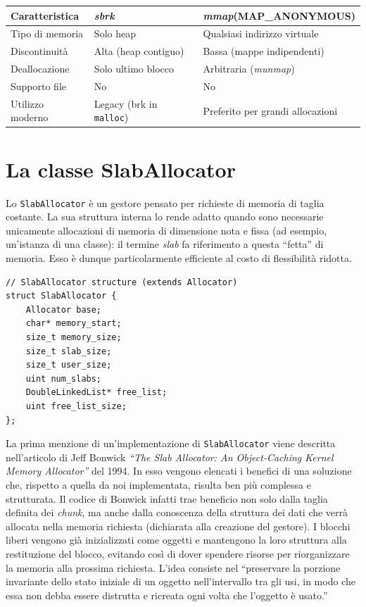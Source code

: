 \begin{center}
\begin{tabular}{|l|l|l|}
\hline
Caratteristica & \textit{sbrk} & \textit{mmap}(MAP\_ANONYMOUS) \\
\hline
Tipo di memoria & Solo heap & Qualsiasi indirizzo virtuale \\
Discontinuità & Alta (heap contiguo) & Bassa (mappe indipendenti) \\
Deallocazione & Solo ultimo blocco & Arbitraria (\textit{munmap}) \\
Supporto file & No & No \\
Utilizzo moderno & Legacy (brk in \texttt{malloc}) & Preferito per grandi allocazioni \\
\hline
\end{tabular}
\end{center}


\section{La classe SlabAllocator}
Lo \texttt{SlabAllocator} è un gestore pensato per richieste di memoria di taglia costante. La sua struttura interna lo rende adatto quando sono necessarie unicamente allocazioni di memoria di dimensione nota e fissa (ad esempio, un'istanza di una classe): il termine \textit{slab} fa riferimento a questa “fetta” di memoria. Esso è dunque particolarmente efficiente al costo di flessibilità ridotta.

\begin{lstlisting}
// SlabAllocator structure (extends Allocator)
struct SlabAllocator {
    Allocator base;
    char* memory_start;
    size_t memory_size;
    size_t slab_size;   
    size_t user_size;
    uint num_slabs;
    DoubleLinkedList* free_list;   
    uint free_list_size;
};
\end{lstlisting}

La prima menzione di un’implementazione di \texttt{SlabAllocator} viene descritta nell’articolo di Jeff Bonwick \textit{“The Slab Allocator: An Object-Caching Kernel Memory Allocator”}\cite{bonwick1994} del 1994. In esso vengono elencati i benefici di una soluzione che, rispetto a quella da noi implementata, risulta ben più complessa e strutturata. Il codice di Bonwick infatti trae beneficio non solo dalla taglia definita dei \textit{chunk}, ma anche dalla conoscenza della struttura dei dati che verrà allocata nella memoria richiesta (dichiarata alla creazione del gestore). I blocchi liberi vengono già inizializzati come oggetti e mantengono la loro struttura alla restituzione del blocco, evitando così di dover spendere risorse per riorganizzare la memoria alla prossima richiesta. L’idea consiste nel “preservare la porzione invariante dello stato iniziale di un oggetto nell’intervallo tra gli usi, in modo che essa non debba essere distrutta e ricreata ogni volta che l’oggetto è usato.”

